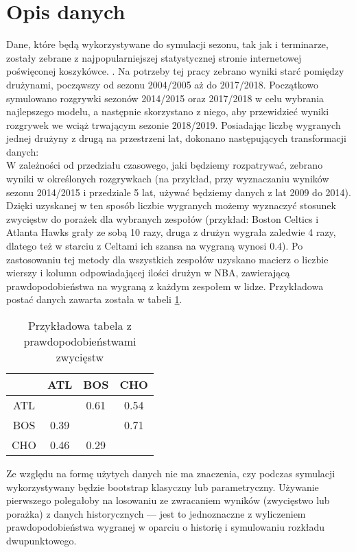 \documentclass[inzynierska]{pwr_wmat_praca_dyplomowa}
\theoremstyle{plain}
\numberwithin{theorem}{chapter}
\theoremstyle{definition}
\numberwithin{theorem}{chapter}
\begin{document}
\section{Opis danych}
Dane, które będą wykorzystywane do symulacji sezonu, tak jak i terminarze, zostały zebrane z najpopularniejszej statystycznej stronie internetowej poświęconej koszykówce. \cite{dane}. Na potrzeby tej pracy zebrano wyniki starć pomiędzy drużynami, począwszy od sezonu 2004/2005 aż do 2017/2018. Początkowo symulowano rozgrywki sezonów 2014/2015 oraz 2017/2018 w celu wybrania najlepszego modelu, a następnie skorzystano z niego, aby przewidzieć wyniki rozgrywek we wciąż trwającym sezonie 2018/2019.
Posiadając liczbę wygranych jednej drużyny z drugą na przestrzeni lat, dokonano następujących transformacji danych:
\\
\hspace*{6mm}W zależności od przedziału czasowego, jaki będziemy rozpatrywać, zebrano wyniki w określonych rozgrywkach (na przykład, przy wyznaczaniu wyników sezonu 2014/2015 i przedziale 5 lat, używać będziemy danych z lat 2009 do 2014). Dzięki uzyskanej w ten sposób liczbie wygranych możemy wyznaczyć stosunek zwycięstw do porażek dla wybranych zespołów (przykład: Boston Celtics i Atlanta Hawks grały ze sobą 10 razy, druga z drużyn wygrała zaledwie 4 razy, dlatego też w starciu z Celtami ich szansa na wygraną wynosi $0.4$). Po zastosowaniu tej metody dla wszystkich zespołów uzyskano macierz o liczbie wierszy i kolumn odpowiadającej ilości drużyn w NBA, zawierającą prawdopodobieństwa na wygraną z każdym zespołem w lidze. Przykładowa postać danych zawarta została w tabeli \ref{dane_tabela}.
\begin{table}[]
	\centering
	\begin{tabular}{|c|c|c|c|}
		\hline
		&ATL & BOS & CHO\\ \hline
		ATL &  & 0.61&0.54\\ \hline
		BOS & 0.39 & &0.71\\ \hline
		CHO & 0.46 & 0.29&\\ \hline
	\end{tabular}
	\caption{Przykładowa tabela z prawdopodobieństwami zwycięstw}\label{dane_tabela}	
\end{table}

Ze względu na formę użytych danych nie ma znaczenia, czy podczas symulacji wykorzystywany będzie bootstrap klasyczny lub parametryczny. Używanie pierwszego polegałoby na losowaniu ze zwracaniem wyników (zwycięstwo lub porażka) z danych historycznych --- jest to jednoznaczne z wyliczeniem prawdopodobieństwa wygranej w oparciu o historię i symulowaniu rozkładu dwupunktowego.
\end{document}
